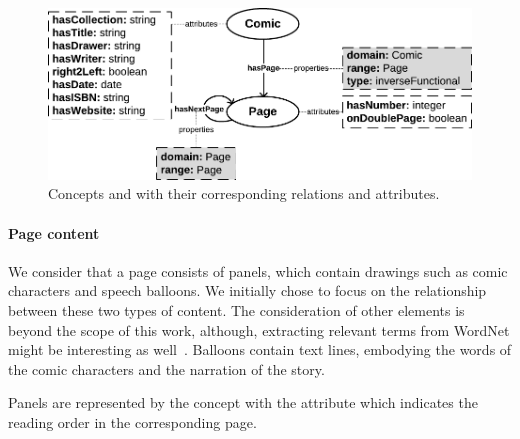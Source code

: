 \begin{figure}[h!]
\begin{center}
\includegraphics[width=1\textwidth]{model_step1.pdf}
\caption[Initial comics model]{Concepts  and  with their corresponding relations and attributes.}
\label{fig:model_d_1}
\end{center}
\end{figure}

\paragraph{Page content} %
\label{par:page_content}

We consider that a page consists of panels, which contain drawings such as comic characters and speech balloons.
We initially chose to focus on the relationship between these two types of content.
The consideration of other elements is beyond the scope of this work, although, extracting relevant terms from WordNet might be interesting as well~\cite{Zinger05extracting}.
Balloons contain text lines, embodying the words of the comic characters and the narration of the story.

Panels are represented by the concept  with the attribute  which indicates the reading order in the corresponding page.

